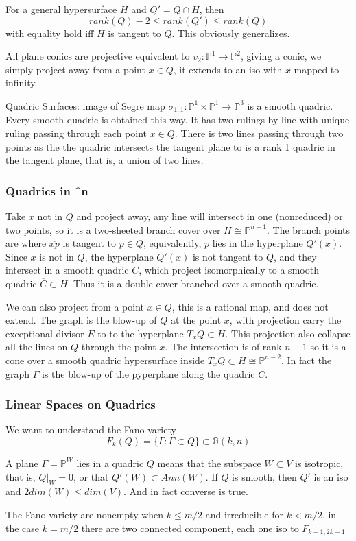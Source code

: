 \documentclass[main.tex]{subfiles}
\newcommand{\Pn}[1]{\mathbb{P}^{#1}}
\begin{document}
For a general hypersurface $H$ and $Q' = Q \cap H$, then 
$$
rank(Q) -2 \leq rank(Q') \leq rank(Q)
$$
with equality hold iff $H$ is tangent to $Q$. This obviously generalizes.

\begin{example}
All plane conics are projective equivalent to $v_2: \Pn{1} \rightarrow \Pn{2}$, giving a conic, we simply project away from a point $x \in Q$, it extends to an iso with $x$ mapped to infinity.
\end{example}

\begin{example}
Quadric Surfaces: image of Segre map $\sigma_{1,1}: \Pn{1} \times \Pn{1} \rightarrow \Pn{3}$ is a smooth quadric. Every smooth quadric is obtained this way. It has two rulings by line with unique ruling passing through each point $x \in Q$. There is two lines passing through two points as the the quadric intersects the tangent plane to is a rank 1 quadric in the tangent plane, that is, a union of two lines.
\end{example}

\subsubsection{Quadrics in \Pn{n}}
Take $x$ not in $Q$ and project away, any line will intersect in one (nonreduced) or two points, so it is a two-sheeted branch cover over $H \cong \Pn{n-1}$. The branch points are where $\overline{xp}$ is tangent to $p \in Q$, equivalently, $p$ lies in the hyperplane $Q'(x)$. Since $x$ is not in $Q$, the hyperplane $Q'(x)$ is not tangent to $Q$, and they intersect in a smooth quadric $C$, which project isomorphically to a smooth quadric $\overline{C} \subset H$. Thus it is a double cover branched over a smooth quadric.


We can also project from a point $x \in Q$, this is a rational map, and does not extend. The graph is the blow-up of $Q$ at the point $x$, with projection carry the exceptional divisor $E$ to to the hyperplane $T_x Q \subset H$. This projection also collapse all the lines on $Q$ through the point $x$. The intersection is of rank $n-1$ so it is a cone over a smooth quadric hypersurface inside $T_x Q \subset H \cong \Pn{n-2}$. In fact the graph $\Gamma$ is the blow-up of the pyperplane along the quadric $C$. 

\subsubsection{Linear Spaces on Quadrics}
We want to understand the Fano variety
$$
F_k(Q) = \{\Gamma: \Gamma \subset Q\} \subset \mathbb{G}(k,n)
$$

A plane $\Gamma = \Pn{W}$ lies in a quadric $Q$ means that the subspace $W \subset V$ is isotropic, that is, $Q|_W = 0$, or that $Q'(W) \subset Ann(W)$. If $Q$ is smooth, then $Q'$ is an iso and $2 dim(W) \leq dim(V)$. And in fact converse is true.

The Fano variety are nonempty when $k \leq m/2$ and irreducible for $k < m/2$, in the case $k = m/2$ there are two connected component, each one iso to $F_{k-1, 2k-1}$
\end{document}
